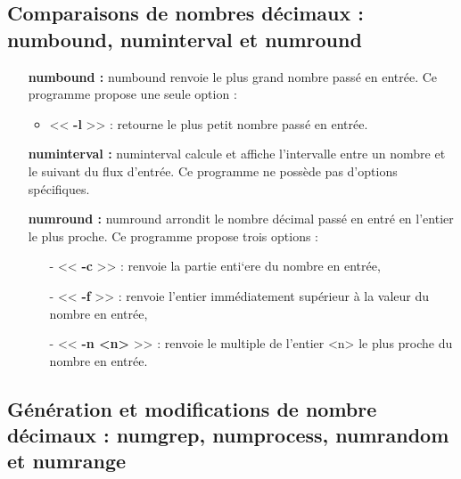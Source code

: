 \subsection{Comparaisons de nombres d\'ecimaux : numbound, numinterval et numround}

\begin{itemize}
 \item[\textbullet]  \textbf{numbound :} numbound renvoie le plus grand nombre pass\'e en entr\'ee.
Ce programme propose une seule option :
\begin{itemize}
  \item << \textbf{-l} >> : retourne le plus petit nombre pass\'e en entr\'ee.
\newline
\end{itemize}
 \item[\textbullet] \textbf{numinterval :} numinterval calcule et affiche l'intervalle entre un nombre et le suivant du flux d'entr\'ee.
Ce programme ne poss\`ede pas d'options sp\'ecifiques.
\newline
 \item[\textbullet] \textbf{numround :} numround arrondit le nombre d\'ecimal pass\'e en entr\'e en l'entier le plus proche.
Ce programme propose trois options :
\begin{itemize}
 \item[-] << \textbf{-c} >> : renvoie la partie enti`ere du nombre en entr\'ee,
 \item[-] << \textbf{-f} >> : renvoie l'entier immédiatement supérieur à la valeur du nombre en entr\'ee, 
 \item[-] << \textbf{-n <n>} >> : renvoie le multiple de l'entier <n> le plus proche du nombre en entr\'ee.
\end{itemize}
\end{itemize}

\subsection{G\'en\'eration et modifications de nombre d\'ecimaux : numgrep, numprocess, numrandom et numrange }


